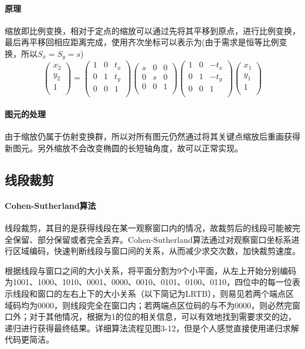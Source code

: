 \documentclass[a4paper,UTF8]{article}
\theoremstyle{definition}
\begin{document}
\paragraph{原理} 缩放即比例变换，相对于定点的缩放可以通过先将其平移到原点，进行比例变换，最后再平移回相应距离完成，使用齐次坐标可以表示为(由于需求是恒等比例变换，所以$S_x=S_y=s$)
\begin{equation}
\left(
\begin{array}{c}
x_2 \\
y_2 \\
1 \\
\end{array}
\right)
=
\left(
\begin{array}{ccc}
1 & 0 & t_x \\
0 & 1 & t_y \\
0 & 0 & 1 \\
\end{array}
\right)
\left(
\begin{array}{ccc}
s & 0 & 0 \\
0 & s & 0 \\
0 & 0 & 1 \\
\end{array}
\right)
\left(
\begin{array}{ccc}
1 & 0 & -t_x \\
0 & 1 & -t_y \\
0 & 0 & 1 \\
\end{array}
\right)
\left(
\begin{array}{c}
x_1 \\
y_1 \\
1 \\
\end{array}
\right)
\end{equation}
\paragraph{图元的处理}
由于缩放仍属于仿射变换群，所以对所有图元仍然通过将其关键点缩放后重画获得新图元。另外缩放不会改变椭圆的长短轴角度，故可以正常实现。
\subsection{线段裁剪}
\paragraph{Cohen-Sutherland算法}
线段裁剪，其目的是获得线段在某一观察窗口内的情况，故裁剪后的线段可能被完全保留、部分保留或者完全丢弃。Cohen-Sutherland算法通过对观察窗口坐标系进行区域编码，快速判断线段与窗口间的关系，从而减少求交次数，加快裁剪速度。
\par 根据线段与窗口之间的大小关系，将平面分割为9个小平面，从左上开始分别编码为1001、1000、1010、0001、0000、0010、0101、0100、0110，四位中的每一位表示线段和窗口的左右上下的大小关系（以下简记为LRTB），则易见若两个端点区域码均为0000，则线段完全在窗口内；若两端点区位码的与不为0000，则必然完窗口外；对于其他情况，根据为1的位的相关信息，可以有效地找到需要求交的边，递归进行获得最终结果\cite{graphTextBook}。详细算法流程见图3-12，但是个人感觉直接使用递归求解代码更简洁。
\end{document}
